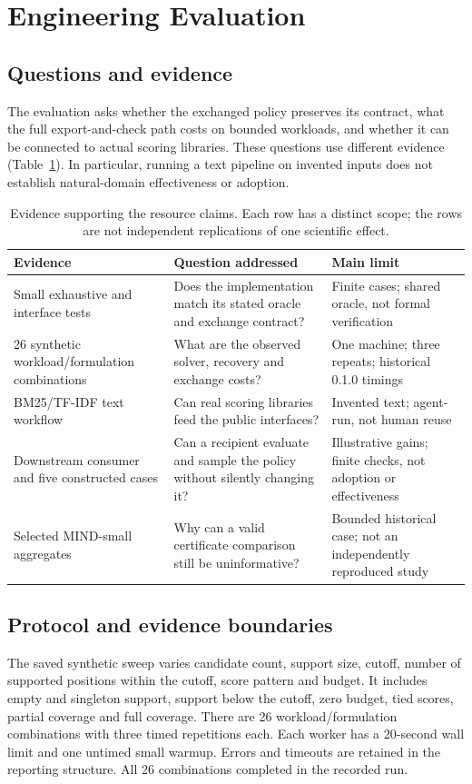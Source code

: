 \documentclass[runningheads]{llncs}
\begin{document}
\section{Engineering Evaluation}
\subsection{Questions and evidence}
The evaluation asks whether the exchanged policy preserves its contract, what
the full export-and-check path costs on bounded workloads, and whether it can
be connected to actual scoring libraries. These questions use different
evidence (Table~\ref{tab:evidence}). In particular, running a text pipeline on
invented inputs does not establish natural-domain effectiveness or adoption.

\begin{table}[t]
\caption{Evidence supporting the resource claims. Each row has a distinct
scope; the rows are not independent replications of one scientific effect.}
\label{tab:evidence}
\small
\begin{tabular}{p{}p{}p{}}
\toprule
Evidence & Question addressed & Main limit\\
\midrule
Small exhaustive and interface tests &
Does the implementation match its stated oracle and exchange contract? &
Finite cases; shared oracle, not formal verification\\
26 synthetic workload/formulation combinations &
What are the observed solver, recovery and exchange costs? &
One machine; three repeats; historical 0.1.0 timings\\
BM25/TF-IDF text workflow &
Can real scoring libraries feed the public interfaces? &
Invented text; agent-run, not human reuse\\
Downstream consumer and five constructed cases &
Can a recipient evaluate and sample the policy without silently changing it? &
Illustrative gains; finite checks, not adoption or effectiveness\\
Selected MIND-small aggregates &
Why can a valid certificate comparison still be uninformative? &
Bounded historical case; not an independently reproduced study\\
\bottomrule
\end{tabular}
\end{table}

\subsection{Protocol and evidence boundaries}
The saved synthetic sweep varies candidate count, support size, cutoff,
number of supported positions within the cutoff, score pattern and budget.
It includes empty and singleton support, support below the cutoff, zero
budget, tied scores, partial coverage and full coverage.
There are 26 workload/formulation combinations with three timed repetitions
each. Each worker has a 20-second wall limit and one untimed small warmup.
Errors and timeouts are retained in the reporting structure. All 26
combinations completed in the recorded run.
\end{document}
